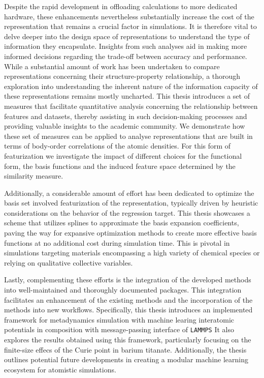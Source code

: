 %
Despite the rapid development in offloading calculations to more dedicated hardware,
these enhancements nevertheless substantially increase the cost of the
representation that remains a crucial factor in simulations.  It is therefore
vital to delve deeper into the design space of representations to understand
the type of information they encapsulate.  Insights from such analyses aid in
making more informed decisions regarding the trade-off between accuracy and
performance.
While a substantial amount of work has been undertaken to compare
representations concerning their structure-property relationship, a thorough
exploration into understanding the inherent nature of the information capacity
of these representations remains mostly uncharted.
This thesis introduces a
set of measures that facilitate quantitative analysis concerning the
relationship between features and datasets, thereby assisting in such
decision-making processes and providing valuable insights to the academic community.
We demonstrate how these set of measures can be applied to analyse 
representations that are built in terms of body-order correlations of the atomic densities.
For this form of featurization we investigate the impact of different choices for the functional form, the basis functions and the induced feature space determined by the similarity measure.

Additionally, a considerable amount of effort has been dedicated to
optimize the basis set involved featurization of the  representation, typically driven by
heuristic considerations on the behavior of the regression target.  This thesis
showcases a scheme that utilizes splines to approximate the basis expansion
coefficients, paving the way for expansive optimization methods to create more
effective basis functions at no additional cost during simulation time.  This
is pivotal in simulations targeting materials encompassing a high variety of
chemical species or relying on qualitative collective variables.

Lastly, complementing these efforts is the integration of the developed methods into well-maintained and thoroughly documented packages.
This integration facilitates an enhancement of the existing methods and the incorporation of the methods into new workflows.
Specifically, this thesis introduces an implemented framework for metadynamics simulation with machine learing interatomic potentials in composition with message-passing interface of \texttt{LAMMPS}
It also explores the results obtained using this framework, particularly focusing on the finite-size effecs of the Curie point in barium titanate.
Additionally, the thesis outlines potential future developments in creating a modular machine learning ecosystem for atomistic simulations.



